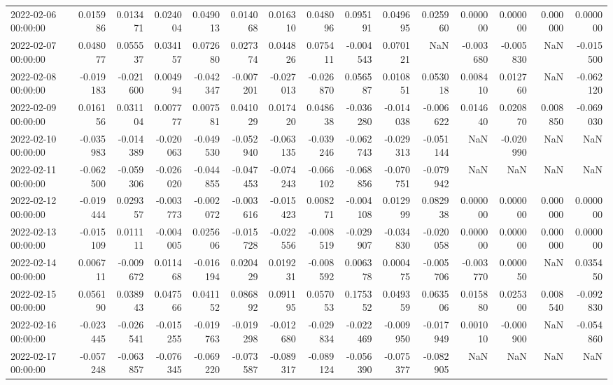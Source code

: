 \begin{tabular}{lrrrrrrrrrrrrrr}
2022-02-06 00:00:00 & 0.015986 & 0.013471 & 0.024004 & 0.049013 & 0.014068 & 0.016310 & 0.048096 & 0.095191 & 0.049695 & 0.025960 & 0.000000 & 0.000000 & 0.000000 & 0.000000 \\
2022-02-07 00:00:00 & 0.048077 & 0.055537 & 0.034157 & 0.072680 & 0.027374 & 0.044826 & 0.075411 & -0.004543 & 0.070121 & NaN & -0.003680 & -0.005830 & NaN & -0.015500 \\
2022-02-08 00:00:00 & -0.019183 & -0.021600 & 0.004994 & -0.042347 & -0.007201 & -0.027013 & -0.026870 & 0.056587 & 0.010851 & 0.053018 & 0.008410 & 0.012760 & NaN & -0.062120 \\
2022-02-09 00:00:00 & 0.016156 & 0.031104 & 0.007777 & 0.007581 & 0.041029 & 0.017420 & 0.048638 & -0.036280 & -0.014038 & -0.006622 & 0.014640 & 0.020870 & 0.008850 & -0.069030 \\
2022-02-10 00:00:00 & -0.035983 & -0.014389 & -0.020063 & -0.049530 & -0.052940 & -0.063135 & -0.039246 & -0.062743 & -0.029313 & -0.051144 & NaN & -0.020990 & NaN & NaN \\
2022-02-11 00:00:00 & -0.062500 & -0.059306 & -0.026020 & -0.044855 & -0.047453 & -0.074243 & -0.066102 & -0.068856 & -0.070751 & -0.079942 & NaN & NaN & NaN & NaN \\
2022-02-12 00:00:00 & -0.019444 & 0.029357 & -0.003773 & -0.002072 & -0.003616 & -0.015423 & 0.008271 & -0.004108 & 0.012999 & 0.082938 & 0.000000 & 0.000000 & 0.000000 & 0.000000 \\
2022-02-13 00:00:00 & -0.015109 & 0.011111 & -0.004005 & 0.025606 & -0.015728 & -0.022556 & -0.008519 & -0.029907 & -0.034830 & -0.020058 & 0.000000 & 0.000000 & 0.000000 & 0.000000 \\
2022-02-14 00:00:00 & 0.006711 & -0.009672 & 0.011468 & -0.016194 & 0.020429 & 0.019231 & -0.008592 & 0.006378 & 0.000475 & -0.005706 & -0.003770 & 0.000050 & NaN & 0.035450 \\
2022-02-15 00:00:00 & 0.056190 & 0.038943 & 0.047566 & 0.041152 & 0.086892 & 0.091195 & 0.057053 & 0.175352 & 0.049359 & 0.063506 & 0.015880 & 0.025300 & 0.008540 & -0.092830 \\
2022-02-16 00:00:00 & -0.023445 & -0.026541 & -0.015255 & -0.019763 & -0.019298 & -0.012680 & -0.029834 & -0.022469 & -0.009950 & -0.017949 & 0.001010 & -0.000900 & NaN & -0.054860 \\
2022-02-17 00:00:00 & -0.057248 & -0.063857 & -0.076345 & -0.069220 & -0.073587 & -0.089317 & -0.089124 & -0.056390 & -0.075377 & -0.082905 & NaN & NaN & NaN & NaN \\

\end{tabular}
